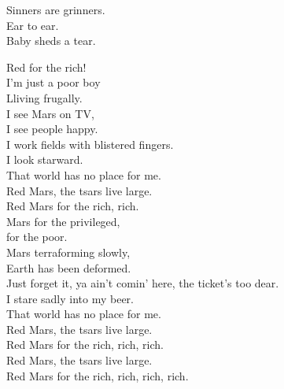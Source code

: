 Sinners are grinners. \\
Ear to ear. \\
Baby  sheds a tear. \\





Red  for the rich! \\

I'm just a poor boy \\
Lliving frugally. \\
I see Mars on TV, \\
I see people happy. \\
I work fields with blistered fingers. \\
I look starward. \\
That world has no place for me. \\

Red Mars, the tsars live large. \\
Red Mars for the rich, rich. \\

Mars for the privileged, \\
 for the poor. \\
Mars terraforming slowly, \\
Earth has been deformed. \\
Just forget it, ya ain't comin' here, the ticket's too dear. \\
I stare sadly into my beer. \\
That world has no place for me. \\

Red Mars, the tsars live large. \\
Red Mars for the rich, rich, rich. \\

Red Mars, the tsars live large. \\
Red Mars for the rich, rich, rich, rich. \\





